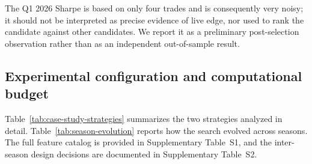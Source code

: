 \documentclass[analytics,article,submit,pdftex,moreauthors]{Definitions/mdpi}
\begin{document}
The Q1 2026 Sharpe is based on only four trades and is consequently very noisy; it should not be interpreted as precise evidence of live edge, nor used to rank the candidate against other candidates. We report it as a preliminary post-selection observation rather than as an independent out-of-sample result.

\subsection{Experimental configuration and computational budget}\label{experimental-configuration}

Table~\ref{tab:case-study-strategies} summarizes the two strategies analyzed in detail. Table~\ref{tab:season-evolution} reports how the search evolved across seasons. The full feature catalog is provided in Supplementary Table~S1, and the inter-season design decisions are documented in Supplementary Table~S2.
\end{document}
